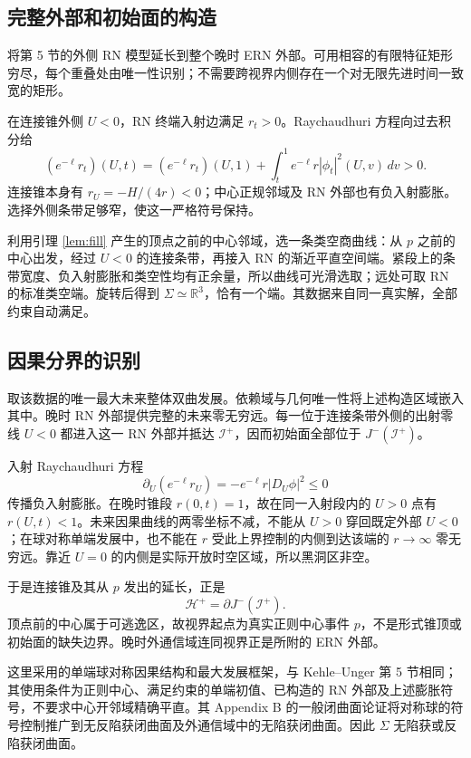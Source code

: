 \subsection{完整外部和初始面的构造}
将第 5 节的外侧 RN 模型延长到整个晚时 ERN 外部。可用相容的有限特征矩形穷尽，每个重叠处由唯一性识别；不需要跨视界内侧存在一个对无限先进时间一致宽的矩形。

在连接锥外侧 $U<0$，RN 终端入射边满足 $r_t>0$。Raychaudhuri 方程向过去积分给
\begin{equation}\label{eq:lambda}
(e^{-\ell}r_t)(U,t)=(e^{-\ell}r_t)(U,1)
+\int_t^1 e^{-\ell}r|\phi_t|^2(U,v)\,dv>0.
\end{equation}
连接锥本身有 $r_U=-H/(4r)<0$；中心正规邻域及 RN 外部也有负入射膨胀。选择外侧条带足够窄，使这一严格符号保持。

利用引理 \ref{lem:fill} 产生的顶点之前的中心邻域，选一条类空商曲线：从 $p$ 之前的中心出发，经过 $U<0$ 的连接条带，再接入 RN 的渐近平直空间端。紧段上的条带宽度、负入射膨胀和类空性均有正余量，所以曲线可光滑选取；远处可取 RN 的标准类空端。旋转后得到 $\Sigma\simeq\mathbb R^3$，恰有一个端。其数据来自同一真实解，全部约束自动满足。

\subsection{因果分界的识别}
取该数据的唯一最大未来整体双曲发展。依赖域与几何唯一性将上述构造区域嵌入其中。晚时 RN 外部提供完整的未来零无穷远。每一位于连接条带外侧的出射零线 $U<0$ 都进入这一 RN 外部并抵达 $\mathcal I^+$，因而初始面全部位于 $J^-(\mathcal I^+)$。

入射 Raychaudhuri 方程
\[
\partial_U(e^{-\ell}r_U)=-e^{-\ell}r|D_U\phi|^2\le0
\]
传播负入射膨胀。在晚时锥段 $r(0,t)=1$，故在同一入射段内的 $U>0$ 点有 $r(U,t)<1$。未来因果曲线的两零坐标不减，不能从 $U>0$ 穿回既定外部 $U<0$；在球对称单端发展中，也不能在 $r$ 受此上界控制的内侧到达该端的 $r\to\infty$ 零无穷远。靠近 $U=0$ 的内侧是实际开放时空区域，所以黑洞区非空。

于是连接锥及其从 $p$ 发出的延长，正是
\[
\mathcal H^+=\partial J^-(\mathcal I^+).
\]
顶点前的中心属于可逃逸区，故视界起点为真实正则中心事件 $p$，不是形式锥顶或初始面的缺失边界。晚时外通信域连同视界正是所附的 ERN 外部。

这里采用的单端球对称因果结构和最大发展框架，与 Kehle--Unger 第 5 节相同；其使用条件为正则中心、满足约束的单端初值、已构造的 RN 外部及上述膨胀符号，不要求中心开邻域精确平直。其 Appendix B 的一般闭曲面论证将对称球的符号控制推广到无反陷获闭曲面及外通信域中的无陷获闭曲面。因此 $\Sigma$ 无陷获或反陷获闭曲面。

